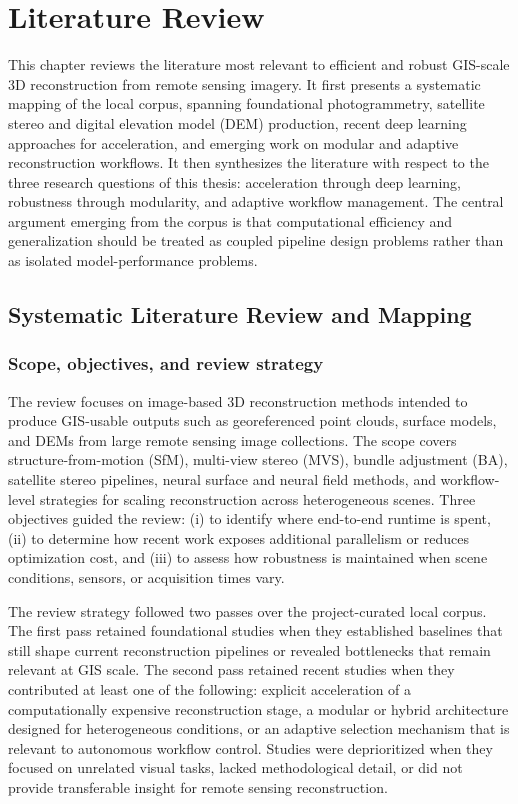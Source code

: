 \chapter{Literature Review}\label{chap:survey}

This chapter reviews the literature most relevant to efficient and robust GIS-scale 3D reconstruction from remote sensing imagery. It first presents a systematic mapping of the local corpus, spanning foundational photogrammetry, satellite stereo and digital elevation model (DEM) production, recent deep learning approaches for acceleration, and emerging work on modular and adaptive reconstruction workflows. It then synthesizes the literature with respect to the three research questions of this thesis: acceleration through deep learning, robustness through modularity, and adaptive workflow management. The central argument emerging from the corpus is that computational efficiency and generalization should be treated as coupled pipeline design problems rather than as isolated model-performance problems.

\section{Systematic Literature Review and Mapping}

\subsection{Scope, objectives, and review strategy}

The review focuses on image-based 3D reconstruction methods intended to produce GIS-usable outputs such as georeferenced point clouds, surface models, and DEMs from large remote sensing image collections. The scope covers structure-from-motion (SfM), multi-view stereo (MVS), bundle adjustment (BA), satellite stereo pipelines, neural surface and neural field methods, and workflow-level strategies for scaling reconstruction across heterogeneous scenes. Three objectives guided the review: (i) to identify where end-to-end runtime is spent, (ii) to determine how recent work exposes additional parallelism or reduces optimization cost, and (iii) to assess how robustness is maintained when scene conditions, sensors, or acquisition times vary.

The review strategy followed two passes over the project-curated local corpus. The first pass retained foundational studies when they established baselines that still shape current reconstruction pipelines or revealed bottlenecks that remain relevant at GIS scale. The second pass retained recent studies when they contributed at least one of the following: explicit acceleration of a computationally expensive reconstruction stage, a modular or hybrid architecture designed for heterogeneous conditions, or an adaptive selection mechanism that is relevant to autonomous workflow control. Studies were deprioritized when they focused on unrelated visual tasks, lacked methodological detail, or did not provide transferable insight for remote sensing reconstruction.

